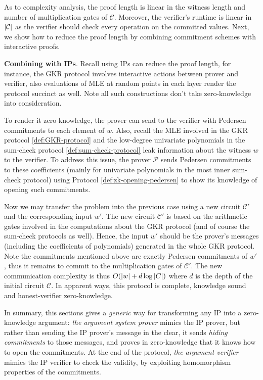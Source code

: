 \documentclass{article}
\begin{document}
As to complexity analysis, the proof length is linear in the witness length and number of multiplication gates of $\mathcal{C}$. Moreover, the verifier's runtime  is linear in $\abs{\mathcal{C}}$ as the verifier should check every operation on the committed values. Next, we show how to reduce the proof length by combining commitment schemes with interactive proofs. 

\textbf{Combining with IPs}. Recall using IPs can reduce the proof length, for instance, the GKR protocol involves interactive actions between prover and verifier, also evaluations of MLE at random points in each layer render the protocol succinct as well. Note all such constructions don't take zero-knowledge into consideration. 

To render it zero-knowledge, the prover can send to the verifier with Pedersen commitments to each element of $w$. Also, recall the MLE involved in the GKR protocol \ref{def:GKR-protocol} and the low-degree univariate polynomials in the sum-check protocol \ref{def:sum-check-protocol} leak information about the witness $w$ to the verifier. To address this issue, the prover $\mathcal{P}$ sends Pedersen commitments to these coefficients (mainly for univariate polynomials in the most inner sum-check protocol) using Protocol \ref{def:zk-opening-pedersen} to show its knowledge of opening such commitments.

Now we may transfer the problem into the previous case using a new circuit $\mathcal{C}'$ and the corresponding input $w'$. The new circuit $\mathcal{C}'$ is based on the arithmetic gates involved in the computations about the GKR protocol (and of course the sum-check protocols as well). Hence, the input $w'$ should be the prover's messages (including the coefficients of polynomials) generated in the whole GKR protocol. Note the commitments mentioned above are exactly Pedersen commitments of $w'$, thus it remains to commit to the multiplication gates of $\mathcal{C}'$. The new communication complexity is thus $O(\abs{w} + d \log \abs{C})$ where $d$ is the depth of the initial circuit $\mathcal{C}$. In apparent ways, this protocol is complete, knowledge sound and honest-verifier zero-knowledge.

In summary, this sections gives a \textit{generic} way for transforming any IP into a zero-knowledge argument: \textit{the argument system prover} mimics the IP prover, but rather than sending the IP prover's message in the clear, it sends \textit{hiding commitments} to those messages, and proves in zero-knowledge that it knows how to open the commitments. At the end of the protocol, \textit{the argument verifier} mimics the IP verifier to check the validity, by exploiting homomorphism properties of the commitments. 
\end{document}
